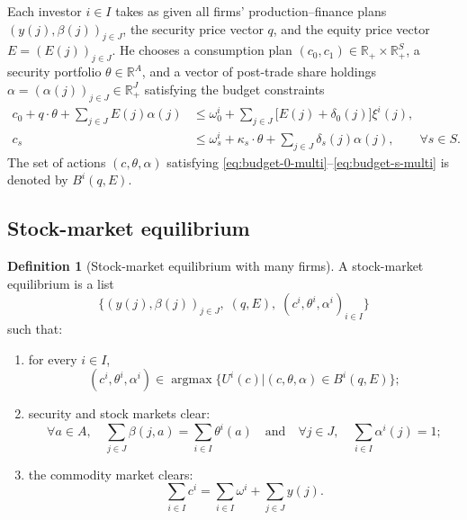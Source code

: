 \documentclass[11pt,a4paper,oneside]{book}
\def\R{\mathbb{R}}
\def\leq{\leqslant}
\def\et{\quad \text{and} \quad}
\DeclareMathOperator*{\argmax}{argmax}
\theoremstyle{plain}
\theoremstyle{definition}
\newtheorem{definition}[theorem]{Definition}
\theoremstyle{remark}
\numberwithin{equation}{chapter}
\begin{document}
Each investor $i \in I$ takes as given all firms' production--finance plans $(y(j), \beta(j))_{j \in J}$, the security price vector $q$, and the equity price vector $E = (E(j))_{j \in J}$.
He chooses a consumption plan $(c_0, c_1) \in \R_+ \times \R_+^S$, a security portfolio $\theta \in \R^A$, and a vector of post-trade share holdings $\alpha = (\alpha(j))_{j \in J} \in \R_+^J$ satisfying the budget constraints
\begin{align}
  c_0 + q \cdot \theta + \sum_{j \in J} E(j) \alpha(j)
  &\leq
  \omega^i_0 + \sum_{j \in J} \bigl[E(j) + \delta_0(j)\bigr] \xi^i(j),
  \label{eq:budget-0-multi}\\[2pt]
  c_s
  &\leq
  \omega^i_s + \kappa_s \cdot \theta + \sum_{j \in J} \delta_s(j) \alpha(j),
  \qquad \forall s \in S.
  \label{eq:budget-s-multi}
\end{align}
The set of actions $(c, \theta, \alpha)$ satisfying \eqref{eq:budget-0-multi}--\eqref{eq:budget-s-multi} is denoted by $B^i(q, E)$.

\subsection{Stock-market equilibrium}

\begin{definition}[Stock-market equilibrium with many firms]\label{def:eq-multi}
A stock-market equilibrium is a list
\begin{equation*}
  \bigl\{ (y(j), \beta(j))_{j \in J}, \; (q, E), \; (c^i, \theta^i, \alpha^i)_{i \in I} \bigr\}
\end{equation*}
such that:
\begin{enumerate}
  \item[(a)] for every $i \in I$,
  \begin{equation*}
    (c^i, \theta^i, \alpha^i) \in \argmax \bigl\{ U^i(c) \vert (c, \theta, \alpha) \in B^i(q, E) \bigr\};
  \end{equation*}
  \item[(b)] security and stock markets clear:
  \begin{equation*}
    \forall a \in A, \quad \sum_{j \in J} \beta(j, a) = \sum_{i \in I} \theta^i(a)
    \et
    \forall j \in J, \quad \sum_{i \in I} \alpha^i(j) = 1;
  \end{equation*}
  \item[(c)] the commodity market clears:
  \begin{equation*}
    \sum_{i \in I} c^i = \sum_{i \in I} \omega^i + \sum_{j \in J} y(j).
  \end{equation*}
\end{enumerate}
\end{definition}
\end{document}
